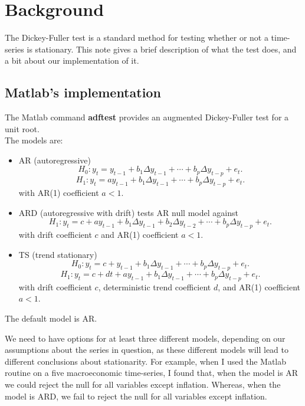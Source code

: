 \documentclass[11pt]{article}
\newcommand{\<}{\ensuremath{\langle}}
\renewcommand{\>}{\ensuremath{\rangle}}
\begin{document}
{\renewcommand{\thefootnote}{}}
\section{Background}
The Dickey-Fuller test is a standard method for testing whether or not a
time-series is stationary.  This note gives a brief description of what the test
does, and a bit about our implementation of it.

\subsection{Matlab's implementation}
The Matlab command {\bf adftest} provides an 
augmented Dickey-Fuller test for a unit root.\\
The models are: 
\begin{itemize}
\item 
AR (autoregressive)
\[
H_0: y_t = y_{t-1} + b_1 \Delta  y_{t-1} +  \cdots + b_p\Delta y_{t-p} + e_t.
\]
\[
H_1: y_{t} = a y_{t-1} + b_1\Delta y_{t-1} + \cdots + b_p\Delta y_{t-p} + e_t.
\]
with AR(1) coefficient $a < 1$.

\item ARD (autoregressive with drift)
tests AR null model against
\[
H_1:  y_{t} = c + a y_{t-1} + b_1\Delta y_{t-1} + b_2\Delta y_{t-2} + \cdots + b_p\Delta y_{t-p} + e_t.
\]
with drift coefficient $c$ and AR(1) coefficient $a < 1$.

\item TS (trend stationary) 
\[
H_0: y_{t} = c +  y_{t-1} + b_1\Delta y_{t-1} + \cdots + b_p\Delta y_{t-p} + e_t.
\]
\[
H_1: y_{t} = c + dt + a y_{t-1} + b_1\Delta y_{t-1} + \cdots + b_p\Delta y_{t-p} + e_t.
\]
with drift coefficient $c$, deterministic trend coefficient $d$, and AR(1) coefficient $a < 1$. 
\end{itemize}
The default model is AR.

We need to have options for at least three different
models, depending on our 
assumptions about the series in question, as these different models will lead to
different conclusions about stationarity.
For example, when I used the Matlab routine on a five macroeconomic time-series,
I found that, when the model is AR we could reject the null for all variables except inflation.
Whereas, when the model is ARD, we fail to reject the null for all variables except inflation.
\end{document}

